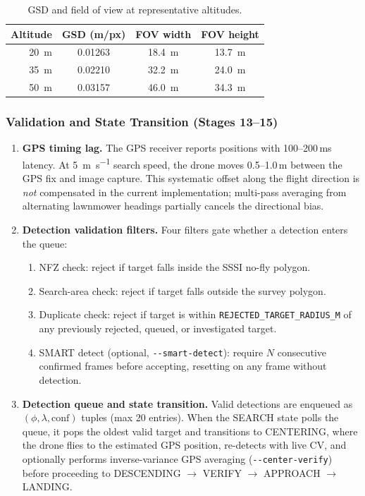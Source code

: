 \documentclass[10pt,a4paper]{article}
\begin{document}
\begin{table}[ht]
  \centering\small
  \caption{GSD and field of view at representative altitudes.}\label{tab:gsd-values}
  \begin{tabular}{@{}rccc@{}}
    \toprule
    \textbf{Altitude} & \textbf{GSD (m/px)} & \textbf{FOV width} & \textbf{FOV height} \\
    \midrule
    \SI{20}{\metre} & 0.01263 & \SI{18.4}{\metre} & \SI{13.7}{\metre} \\
    \SI{35}{\metre} & 0.02210 & \SI{32.2}{\metre} & \SI{24.0}{\metre} \\
    \SI{50}{\metre} & 0.03157 & \SI{46.0}{\metre} & \SI{34.3}{\metre} \\
    \bottomrule
  \end{tabular}
\end{table}

\subsubsection{Validation and State Transition (Stages 13--15)}

\begin{enumerate}[resume]
  \item \textbf{GPS timing lag.} The GPS receiver reports positions with 100--200\,ms latency.  At \SI{5}{\metre\per\second} search speed, the drone moves 0.5--1.0\,m between the GPS fix and image capture.  This systematic offset along the flight direction is \emph{not} compensated in the current implementation; multi-pass averaging from alternating lawnmower headings partially cancels the directional bias.

  \item \textbf{Detection validation filters.}  Four filters gate whether a detection enters the queue:
  \begin{enumerate}[label=(\alph*)]
    \item NFZ check: reject if target falls inside the SSSI no-fly polygon.
    \item Search-area check: reject if target falls outside the survey polygon.
    \item Duplicate check: reject if target is within \texttt{REJECTED\_TARGET\_RADIUS\_M} of any previously rejected, queued, or investigated target.
    \item SMART detect (optional, \texttt{-{}-smart-detect}): require $N$ consecutive confirmed frames before accepting, resetting on any frame without detection.
  \end{enumerate}

  \item \textbf{Detection queue and state transition.}  Valid detections are enqueued as $(\phi, \lambda, \text{conf})$ tuples (max 20 entries).  When the SEARCH state polls the queue, it pops the oldest valid target and transitions to CENTERING, where the drone flies to the estimated GPS position, re-detects with live CV, and optionally performs inverse-variance GPS averaging (\texttt{-{}-center-verify}) before proceeding to DESCENDING $\to$ VERIFY $\to$ APPROACH $\to$ LANDING.
\end{enumerate}
\end{document}
